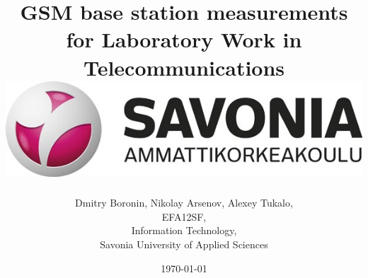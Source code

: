 \documentclass[english]{article}
\date{}
\begin{document}
\title{\vspace{2in}GSM base station measurements\\
\small for Laboratory Work in Telecommunications\\
\vspace{0.5in}\includegraphics{savonia.jpg}}

\nopagebreak
\maketitle


\vspace{3in}

\author{
\begin{flushright}
Dmitry Boronin, Nikolay Arsenov, Alexey Tukalo,\\
EFA12SF,\\
Information Technology,\\
Savonia University of Applied Sciences
\end{flushright}
}

\date{\today}
\thispagestyle{empty}

\newpage
\setcounter{page}{1}
\setcounter{tocdepth}{2}
\tableofcontents

\newpage

\end{document}
